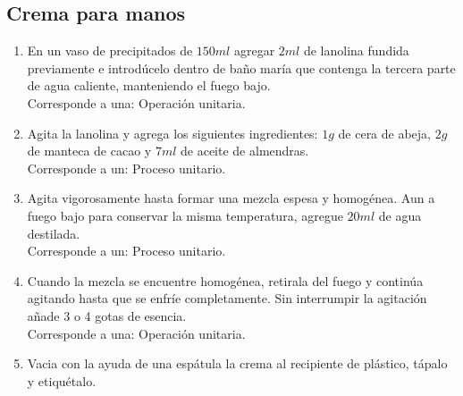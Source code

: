 \documentclass[12pt]{article}
\begin{document}
	\subsection{Crema para manos}
		\begin{enumerate}
			\item En un vaso de precipitados de $150 ml$ agregar $2 ml$ de lanolina fundida previamente e introdúcelo dentro de baño maría que contenga la tercera parte de agua caliente, manteniendo el fuego bajo.\\
			Corresponde a una: Operación unitaria.  


			\item Agita la lanolina y agrega los siguientes ingredientes: $1g$ de cera de abeja, $2g$ de manteca de cacao y $7ml$ de aceite de almendras.\\
			Corresponde a un: Proceso unitario.
			\item Agita vigorosamente hasta formar una mezcla espesa y homogénea. Aun a fuego bajo para conservar la misma temperatura, agregue $20ml$ de agua destilada.\\
			Corresponde a un: Proceso unitario.

			\item Cuando la mezcla se encuentre homogénea, retirala del fuego y continúa agitando hasta que se enfríe completamente. Sin interrumpir la agitación añade 3 o 4 gotas de esencia.\\
			Corresponde a una: Operación unitaria.  


			\item Vacia con la ayuda de una espátula la crema al recipiente de plástico, tápalo y etiquétalo.
		\end{enumerate}
\end{document}
